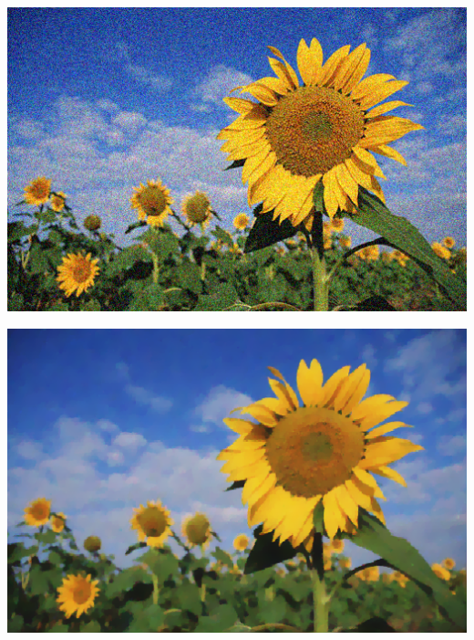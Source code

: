 \begin{frame}
{\begin{minipage}[t][0.25\textheight][t]{\textwidth}
\begin{minipage}{.3\textwidth}
\end{minipage}
\begin{minipage}{.3\textwidth}
\center
\includegraphics[scale=0.15]{figures/motivation/pock-sunflower-noisy.png}
\end{minipage}
\begin{minipage}{.3\textwidth}
\center
\includegraphics[scale=0.15]{figures/motivation/pock-sunflower-fista-denoising-100.png}
\end{minipage}
\end{minipage}
}
%
\end{frame}
